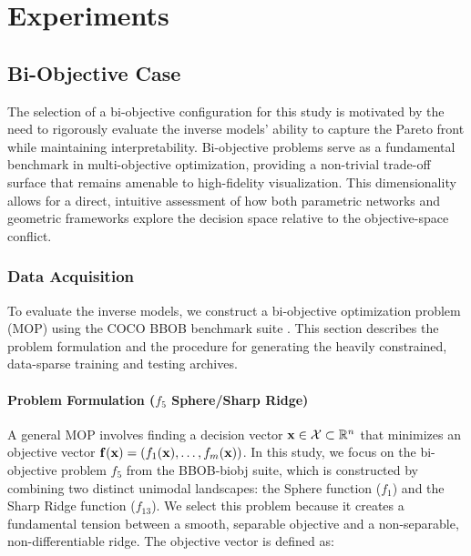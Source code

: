
\chapter{Experiments}\label{chap:experiments}

\section{Bi-Objective Case}\label{sec:exp_coco}
The selection of a bi-objective configuration for this study is motivated by the need to rigorously evaluate the inverse models' ability to capture the Pareto front while maintaining interpretability. Bi-objective problems serve as a fundamental benchmark in multi-objective optimization, providing a non-trivial trade-off surface that remains amenable to high-fidelity visualization. This dimensionality allows for a direct, intuitive assessment of how both parametric networks and geometric frameworks explore the decision space relative to the objective-space conflict. 

\subsection{Data Acquisition}\label{sec:exp_coco_data}

To evaluate the inverse models, we construct a bi-objective optimization problem (MOP) using the COCO BBOB benchmark suite \cite{cocoexDocs, cocoBBOBOverview}. This section describes the problem formulation and the procedure for generating the heavily constrained, data-sparse training and testing archives.

\subsubsection{Problem Formulation ($f_5$ Sphere/Sharp Ridge)}

A general MOP involves finding a decision vector $\mathbf{x} \in \mathcal{X} \subset \mathbb{R}^n$ that minimizes an objective vector $\mathbf{f}(\mathbf{x}) = (f_1(\mathbf{x}), \dots, f_m(\mathbf{x}))$. In this study, we focus on the bi-objective problem $f_5$ from the BBOB-biobj suite, which is constructed by combining two distinct unimodal landscapes: the Sphere function ($f_1$) and the Sharp Ridge function ($f_{13}$). We select this problem because it creates a fundamental tension between a smooth, separable objective and a non-separable, non-differentiable ridge. The objective vector is defined as:

